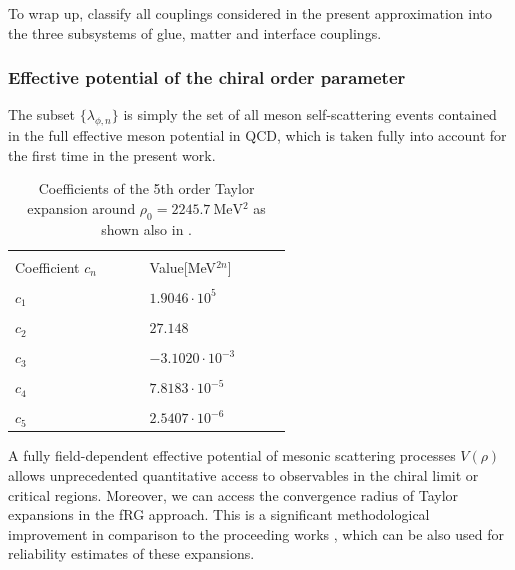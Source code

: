 \documentclass[aps,twocolumn,prd,superscriptaddress]{revtex4-2}
\begin{document}
To wrap up,  classify all couplings considered in the present approximation into the three subsystems of glue, matter and interface couplings.


\subsubsection{Effective potential of the chiral order parameter}
\label{sec:EffPot} 

The subset $\{ \lambda_{\phi,n} \}$ is simply the set of all meson self-scattering events contained in the full effective meson potential in QCD, which is taken fully into account for the first time in the present work. 
%
\begin{table}[b]
	\begin{tabular}{|>{\centering}m{0.3\linewidth}|>{\centering\arraybackslash}m{0.25\linewidth} |}
		\hline &\\[-1ex]
		Coefficient $c_n$ & Value[MeV$^{2n}$] \\[1ex]
		\hline&   \\[-1ex] 
		$c_1$ & $1.9046\cdot10^{5}$\\[1ex]
		\hline& \\[-1ex]
		$c_2$ & $27.148$\\[1ex]
		\hline& \\[-1ex]
		$c_3$ & $-3.1020\cdot10^{-3}$\\[1ex]
		\hline& \\[-1ex]
		$c_4$ & $7.8183\cdot10^{-5}$\\[1ex]
		\hline& \\[-1ex]
		$c_5$ & $2.5407\cdot10^{-6}$\\[1ex] 
		\hline
	\end{tabular}
	\caption{Coefficients of the 5th order Taylor expansion around $\rho_0 =  \qty{2245.7}{\MeV^2}$ as shown also in .\hspace*{\fill}}
	\label{tab:TaylorValues}
\end{table}
%

A fully field-dependent effective potential of mesonic scattering processes $V(\rho)$ allows unprecedented quantitative access to observables in the chiral limit or critical regions. Moreover, we can access the convergence radius of Taylor expansions in the fRG approach. This is a significant methodological improvement in comparison to the proceeding works \cite{Braun:2014ata, Fu:2019hdw}, which can be also used for reliability estimates of these expansions. 
\end{document}
